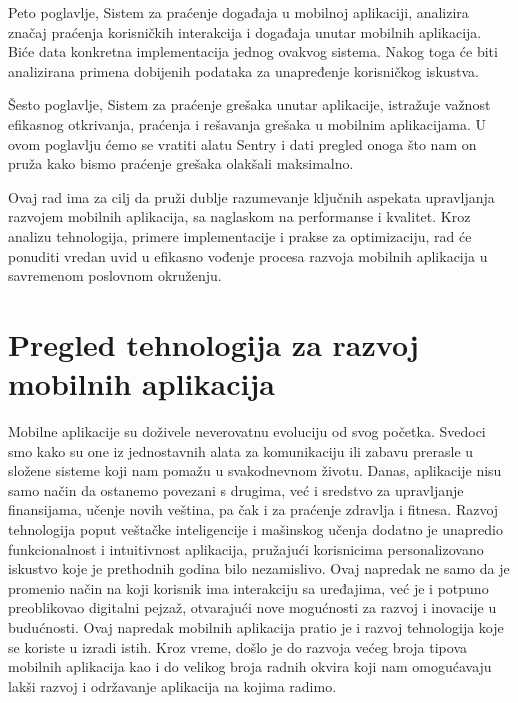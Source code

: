 \documentclass[12pt,oneside]{memoir}
\begin{document}
Peto poglavlje, Sistem za praćenje događaja u mobilnoj aplikaciji, analizira značaj praćenja korisničkih interakcija i događaja unutar mobilnih aplikacija. Biće data konkretna implementacija jednog ovakvog sistema. Nakog toga će biti analizirana primena dobijenih podataka za unapređenje korisničkog iskustva.

Šesto poglavlje, Sistem za praćenje grešaka unutar aplikacije, istražuje važnost efikasnog otkrivanja, praćenja i rešavanja grešaka u mobilnim aplikacijama. U ovom poglavlju ćemo se vratiti alatu Sentry i dati pregled onoga što nam on pruža kako bismo praćenje grešaka olakšali maksimalno.

Ovaj rad ima za cilj da pruži dublje razumevanje ključnih aspekata upravljanja razvojem mobilnih aplikacija, sa naglaskom na performanse i kvalitet. Kroz analizu tehnologija, primere implementacije i prakse za optimizaciju, rad će ponuditi vredan uvid u efikasno vođenje procesa razvoja mobilnih aplikacija u savremenom poslovnom okruženju.

\chapter{Pregled tehnologija za razvoj mobilnih aplikacija}
\label{chp:pregledTehnologijaZaRazvojMobilnihAplikacija}

Mobilne aplikacije su doživele neverovatnu evoluciju od svog početka. Svedoci smo kako su one iz jednostavnih alata za komunikaciju ili zabavu prerasle u složene sisteme koji nam pomažu u svakodnevnom životu. Danas, aplikacije nisu samo način da ostanemo povezani s drugima, već i sredstvo za upravljanje finansijama, učenje novih veština, pa čak i za praćenje zdravlja i fitnesa. Razvoj tehnologija poput veštačke inteligencije i mašinskog učenja dodatno je unapredio funkcionalnost i intuitivnost aplikacija, pružajući korisnicima personalizovano iskustvo koje je prethodnih godina bilo nezamislivo. Ovaj napredak ne samo da je promenio način na koji korisnik ima interakciju sa uređajima, već je i potpuno preoblikovao digitalni pejzaž, otvarajući nove mogućnosti za razvoj i inovacije u budućnosti. Ovaj napredak mobilnih aplikacija pratio je i razvoj tehnologija koje se koriste u izradi istih. Kroz vreme, došlo je do razvoja većeg broja tipova mobilnih aplikacija kao i do velikog broja radnih okvira koji nam omogućavaju lakši razvoj i održavanje aplikacija na kojima radimo.
\end{document}
